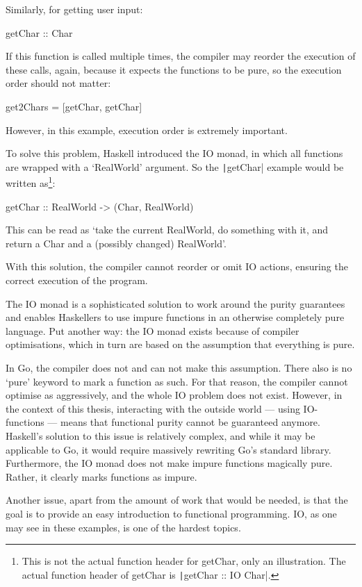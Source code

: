 Similarly, for getting user input:
\begin{haskellcode}
getChar :: Char
\end{haskellcode}
If this function is called multiple times, the compiler may reorder the
execution of these calls, again, because it expects the functions to be
pure, so the execution order should not matter:
\begin{haskellcode}
get2Chars = [getChar, getChar]
\end{haskellcode}
However, in this example, execution order is extremely important.

To solve this problem, Haskell introduced the IO monad, in which
all functions are wrapped with a `RealWorld' argument. So the
\texttt|getChar| example would be written as\footnote{
	This is not the actual function header for getChar, only an illustration.
	The actual function header of getChar is \texttt|getChar :: IO Char|.
}:

\begin{haskellcode}
getChar :: RealWorld -> (Char, RealWorld)
\end{haskellcode}
This can be read as `take the current RealWorld, do something with it,
and return a Char and a (possibly changed) RealWorld'\autocite{haskell-io}.

With this solution, the compiler cannot reorder or omit IO actions, ensuring
the correct execution of the program.

The IO monad is a sophisticated solution to work around the purity guarantees and
enables Haskellers to use impure functions in an otherwise completely pure language.
Put another way: the IO monad exists because of compiler optimisations, which in turn are
based on the assumption that everything is pure.

In Go, the compiler does not and can not make this assumption. There also
is no `pure' keyword to mark a function as such. For that reason, the
compiler cannot optimise as aggressively, and the whole IO problem does
not exist. However, in the context of this thesis, interacting with the outside world ---
using IO-functions --- means that functional purity cannot be guaranteed anymore.
Haskell's solution to this issue is relatively complex, and while it may be applicable
to Go, it would require massively rewriting Go's standard library. Furthermore,
the IO monad does not make impure functions magically pure. Rather, it
clearly marks functions as impure.

Another issue, apart from the amount of work that would be needed, is that
the goal is to provide an easy introduction to functional programming.
IO, as one may see in these examples, is one of the hardest topics.

